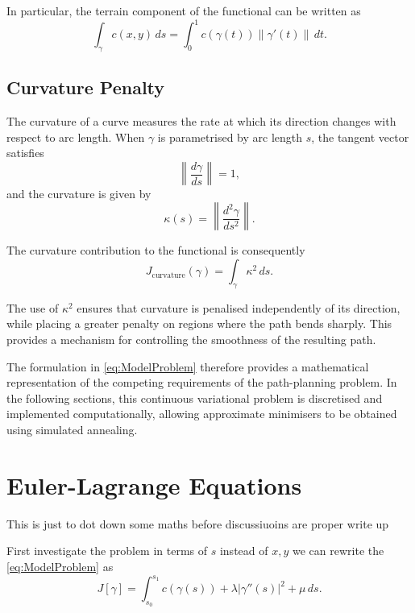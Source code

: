 In particular, the terrain component of the functional can be written
as
\begin{equation}
\int_\gamma c(x,y)\,ds
=
\int_0^1
c(\gamma(t))
\|\gamma'(t)\|\,dt.
\end{equation}

\subsection{Curvature Penalty}
\label{subsec:curvature_penalty}

The curvature of a curve measures the rate at which its direction
changes with respect to arc length. When $\gamma$ is parametrised by
arc length $s$, the tangent vector satisfies
\[
\left\|\frac{d\gamma}{ds}\right\|=1,
\]
and the curvature is given by
\begin{equation}
\kappa(s)
=
\left\|
\frac{d^2\gamma}{ds^2}
\right\|.
\label{eq:curvature_arclength}
\end{equation}

The curvature contribution to the functional is consequently
\begin{equation}
J_{\mathrm{curvature}}(\gamma)
=
\int_\gamma \kappa^2\,ds.
\label{eq:curvature_functional}
\end{equation}

The use of $\kappa^2$ ensures that curvature is penalised independently
of its direction, while placing a greater penalty on regions where the
path bends sharply. This provides a mechanism for controlling the
smoothness of the resulting path.

The formulation in \eqref{eq:ModelProblem} therefore provides a
mathematical representation of the competing requirements of the
path-planning problem. In the following sections, this continuous
variational problem is discretised and implemented computationally,
allowing approximate minimisers to be obtained using simulated
annealing.

\section{Euler-Lagrange Equations}

{\color{red} This is just to dot down some maths before discussiuoins are proper write up}

First investigate the problem in terms of $s$ instead of $x,y$ we can rewrite the \eqref{eq:ModelProblem} as 
\begin{equation}
    \label{eq:ModelPrblem_s}
    J[\gamma] = \int_{s_0}^{s_1} c(\gamma(s)) + \lambda|\gamma''(s)|^2 + \mu \, ds.
\end{equation}

